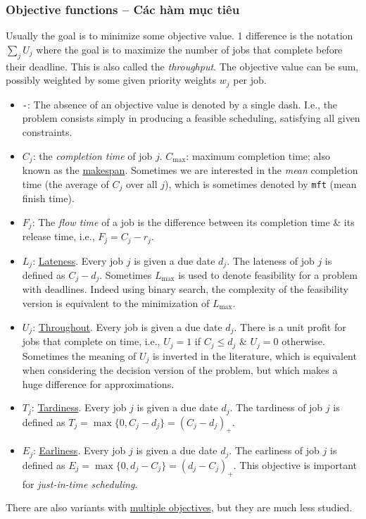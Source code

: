 \documentclass{article}
\begin{document}

\subsubsection{Objective functions -- Các hàm mục tiêu}
Usually the goal is to minimize some objective value. 1 difference is the notation $\sum_j U_j$ where the goal is to maximize the number of jobs that complete before their deadline. This is also called the {\it throughput}. The objective value can be sum, possibly weighted by some given priority weights $w_j$ per job.
\begin{itemize}
	\item {\tt-}: The absence of an objective value is denoted by a single dash. I.e., the problem consists simply in producing a feasible scheduling, satisfying all given constraints.
	\item $C_j$: the {\it completion time} of job $j$. $C_{\max}$: maximum completion time; also known as the \href{https://en.wikipedia.org/wiki/Makespan}{makespan}. Sometimes we are interested in the {\it mean} completion time (the average of $C_j$ over all $j$), which is sometimes denoted by {\tt mft} (mean finish time).
	\item $F_j$: The {\it flow time} of a job is the difference between its completion time \& its release time, i.e., $F_j = C_j - r_j$.
	\item $L_j$: \href{https://en.wikipedia.org/wiki/Lateness_(scheduling)}{Lateness}. Every job $j$ is given a due date $d_j$. The lateness of job $j$ is defined as $C_j - d_j$. Sometimes $L_{\max}$ is used to denote feasibility for a problem with deadlines. Indeed using binary search, the complexity of the feasibility version is equivalent to the minimization of $L_{\max}$.
	\item $U_j$: \href{https://en.wikipedia.org/wiki/Throughput}{Throughout}. Every job is given a due date $d_j$. There is a unit profit for jobs that complete on time, i.e., $U_j = 1$ if $C_j\le d_j$ \& $U_j = 0$ otherwise. Sometimes the meaning of $U_j$ is inverted in the literature, which is equivalent when considering the decision version of the problem, but which makes a huge difference for approximations.
	\item $T_j$: \href{https://en.wikipedia.org/wiki/Tardiness_(scheduling)}{Tardiness}. Every job $j$ is given a due date $d_j$. The tardiness of job $j$ is defined as $T_j = \max\{0,C_j - d_j\} = (C_j - d_j)_+$.
	\item $E_j$: \href{https://en.wikipedia.org/wiki/Earliness_(scheduling)}{Earliness}. Every job $j$ is given a due date $d_j$. The earliness of job $j$ is defined as $E_j = \max\{0,d_j - C_j\} = (d_j - C_j)_+$. This objective is important for {\it just-in-time scheduling}.
\end{itemize}
There are also variants with \href{https://en.wikipedia.org/wiki/Multi-objective_optimization}{multiple objectives}, but they are much less studied.
\end{document}
